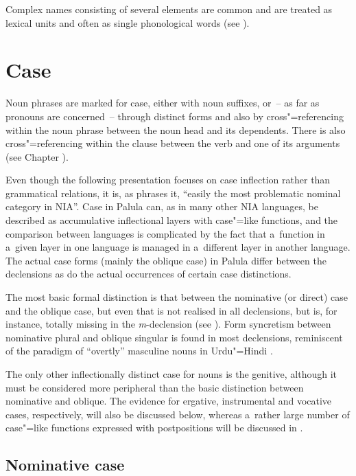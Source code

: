 Complex names consisting of several elements are common and are treated as lexical units and often as single phonological words (see ).

\section{Case}
\label{sec:4-5}

Noun phrases are marked for case, either with noun suffixes, or~-- as far as pronouns are concerned~-- through distinct forms and also by cross"=referencing within the noun phrase between the noun head and its dependents. There is also cross"=referencing within the clause between the verb and one of its arguments (see Chapter ).


Even though the following presentation focuses on case inflection rather than grammatical relations, it is, as \citet[230--231]{masica1991} phrases it, ``easily the most problematic nominal category in NIA''. Case in Palula can, as in many other NIA languages, be described as accumulative inflectional layers with case"=like functions, and the comparison between languages is complicated by the fact that a~function in a~given layer in one language is managed in a~different layer in another language. The actual case forms (mainly the oblique case) in Palula differ between the declensions as do the actual occurrences of certain case distinctions. 


The most basic formal distinction is that between the nominative (or direct) case and the oblique case, but even that is not realised in all declensions, but is, for instance, totally missing in the \textit{m}-declension (see ). Form syncretism \citep[27]{matthews1991} between nominative plural and oblique singular is found in most declensions, reminiscent of the paradigm of ``overtly'' masculine nouns in Urdu"=Hindi \citep[1]{schmidt1999}.


The only other inflectionally distinct case for nouns is the genitive, although it must be considered more peripheral than the basic distinction between nominative and oblique. The evidence for ergative, instrumental and vocative cases, respectively, will also be discussed below, whereas a~rather large number of case"=like functions expressed with postpositions will be discussed in .


\subsection{Nominative case}
\label{subsec:4-5-1}

